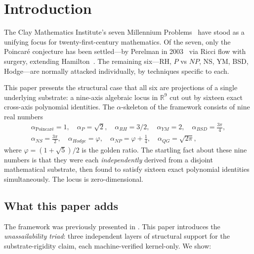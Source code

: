 \documentclass[11pt,a4paper]{amsart}
\theoremstyle{plain}
\theoremstyle{definition}
\newcommand{\Rl}{\mathbb{R}}
\newcommand{\aP}{\alpha_{P}}
\newcommand{\aNP}{\alpha_{NP}}
\newcommand{\aRH}{\alpha_{RH}}
\newcommand{\aYM}{\alpha_{YM}}
\newcommand{\aNS}{\alpha_{NS}}
\newcommand{\aBSD}{\alpha_{BSD}}
\newcommand{\aHodge}{\alpha_{Hodge}}
\newcommand{\aPoinc}{\alpha_{\text{Poincar\'e}}}
\newcommand{\aQG}{\alpha_{QG}}
\newcommand{\golden}{\varphi}
\begin{document}
\section{Introduction}
\label{sec:intro}

The Clay Mathematics Institute's seven Millennium Problems~\cite{cmi2000}
have stood as a unifying focus for twenty-first-century mathematics. Of
the seven, only the Poincar\'e conjecture has been settled---by Perelman
in 2003~\cite{perelman2003} via Ricci flow with surgery, extending
Hamilton~\cite{hamilton1982}. The remaining six---RH, $P$ vs $NP$, NS,
YM, BSD, Hodge---are normally attacked individually, by techniques
specific to each.

This paper presents the structural case that all six are projections of
a single underlying substrate: a nine-axis algebraic locus in $\Rl^{9}$
cut out by sixteen exact cross-axis polynomial identities. The
$\alpha$-skeleton of the framework consists of nine real numbers
\begin{align*}
\aPoinc = 1, \quad \aP = \sqrt{2}, \quad \aRH = 3/2, \quad
\aYM = 2, \quad \aBSD = \tfrac{3\pi}{4}, \\
\aNS = \tfrac{3\pi}{2}, \quad \aHodge = \golden, \quad
\aNP = \golden + \tfrac{1}{4}, \quad \aQG = \sqrt{2\pi},
\end{align*}
where $\golden = (1+\sqrt{5})/2$ is the golden ratio. The startling fact
about these nine numbers is that they were each \emph{independently}
derived from a disjoint mathematical substrate, then found to satisfy
sixteen exact polynomial identities simultaneously. The locus is
zero-dimensional.

\subsection{What this paper adds}
The framework was previously presented in
\cite{cohen2026bulletproof,cohen2026manuscript}. This paper introduces
the \emph{unassailability triad}: three independent layers of structural
support for the substrate-rigidity claim, each machine-verified
kernel-only. We show:
\end{document}
